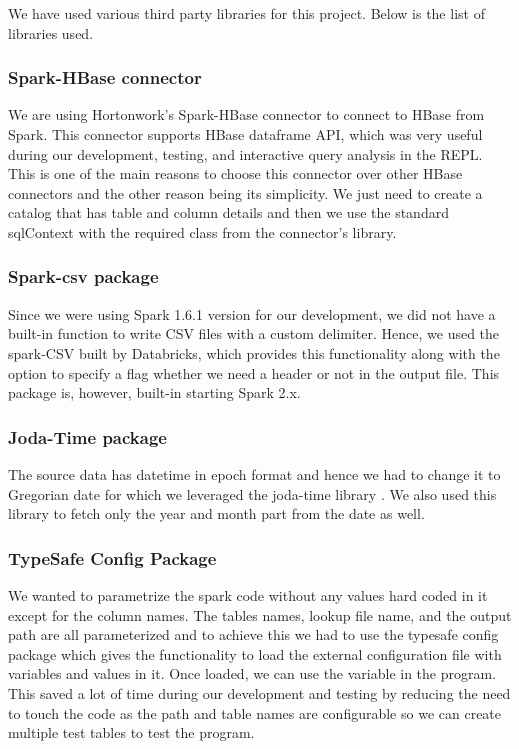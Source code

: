 \documentclass{acm_proc_article-sp}
\begin{document}
We have used various third party libraries for this project.  Below is the list of libraries used.

\subsubsection{Spark-HBase connector}
We are using Hortonwork's Spark-HBase connector \cite{www-spark-hbase-connector} to connect to HBase from Spark.  This connector supports HBase dataframe API, which was very useful during our development, testing, and interactive query analysis in the REPL.  This is one of the main reasons to choose this connector over other HBase connectors and the other reason being its simplicity.  We just need to create a catalog that has table and column details and then we use the standard sqlContext with the required class from the connector's library.

\subsubsection{Spark-csv package}
Since we were using Spark 1.6.1 version for our development, we did not have a built-in function to write CSV files with a custom delimiter.  Hence, we used the spark-CSV \cite{www-spark-csv} built by Databricks, which provides this functionality along with the option to specify a flag whether we need a header or not in the output file.  This package is, however, built-in starting Spark 2.x.

\subsubsection{Joda-Time package}
The source data has datetime in epoch format and hence we had to change it to Gregorian date for which we leveraged the joda-time library \cite{www-spark-joda-time}.  We also used this library to fetch only the year and month part from the date as well.

\subsubsection{TypeSafe Config Package}
We wanted to parametrize the spark code without any values hard coded in it except for the column names.  The tables names, lookup file name, and the output path are all parameterized and to achieve this we had to use the typesafe config package \cite{www-typesafe-config} which gives the functionality to load the external configuration file with variables and values in it.  Once loaded, we can use the variable in the program.  This saved a lot of time during our development and testing by reducing the need to touch the code as the path and table names are configurable so we can create multiple test tables to test the program.
\end{document}
